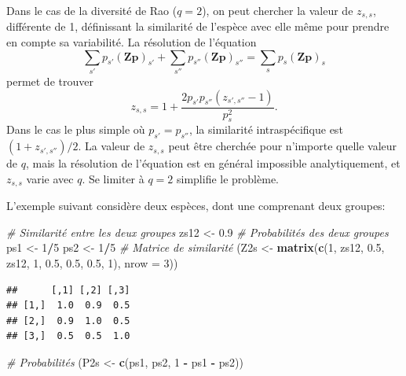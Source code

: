 \documentclass[
  11pt,
  french,
  a4paper,
  extrafontsizes,onecolumn,openright
  ]{memoir}
\newenvironment{Shaded}{\begin{snugshade}}{\end{snugshade}}
\newcommand{\AttributeTok}[1]{\textcolor[rgb]{0.13,0.29,0.53}{#1}}
\newcommand{\CommentTok}[1]{\textcolor[rgb]{0.56,0.35,0.01}{\textit{#1}}}
\newcommand{\DecValTok}[1]{\textcolor[rgb]{0.00,0.00,0.81}{#1}}
\newcommand{\FloatTok}[1]{\textcolor[rgb]{0.00,0.00,0.81}{#1}}
\newcommand{\FunctionTok}[1]{\textcolor[rgb]{0.13,0.29,0.53}{\textbf{#1}}}
\newcommand{\NormalTok}[1]{#1}
\newcommand{\OtherTok}[1]{\textcolor[rgb]{0.56,0.35,0.01}{#1}}
\newcommand{\SpecialCharTok}[1]{\textcolor[rgb]{0.81,0.36,0.00}{\textbf{#1}}}
\begin{document}
Dans le cas de la diversité de Rao (\(q=2\)), on peut chercher la valeur de \(z_{s,s}\), différente de 1, définissant la similarité de l'espèce avec elle même pour prendre en compte sa variabilité.
La résolution de l'équation
\[\sum_{s'}{p_{s'}{\left(\mathbf{Zp}\right)}_{s'}}+\sum_{s''}{p_{s''}{\left(\mathbf{Zp}\right)}_{s''}} = \sum_{s}{p_{s}{\left(\mathbf{Zp}\right)}_{s}}\]
permet de trouver
\[z_{s,s}=1+ \frac{2 p_{s'} p_{s''}(z_{s',s''}-1)}{p_s^2}.\]
Dans le cas le plus simple où \(p_{s'}=p_{s''}\), la similarité intraspécifique est \({(1+z_{s',s''})}/{2}\).
La valeur de \(z_{s,s}\) peut être cherchée pour n'importe quelle valeur de \(q\), mais la résolution de l'équation est en général impossible analytiquement, et \(z_{s,s}\) varie avec \(q\).
Se limiter à \(q=2\) simplifie le problème.

L'exemple suivant considère deux espèces, dont une comprenant deux groupes:

\scriptsize

\begin{Shaded}
\begin{Highlighting}[]
\CommentTok{\# Similarité entre les deux groupes}
\NormalTok{zs12 }\OtherTok{\textless{}{-}} \FloatTok{0.9}
\CommentTok{\# Probabilités des deux groupes}
\NormalTok{ps1 }\OtherTok{\textless{}{-}} \DecValTok{1}\SpecialCharTok{/}\DecValTok{5}
\NormalTok{ps2 }\OtherTok{\textless{}{-}} \DecValTok{1}\SpecialCharTok{/}\DecValTok{5}
\CommentTok{\# Matrice de similarité}
\NormalTok{(Z2s }\OtherTok{\textless{}{-}} \FunctionTok{matrix}\NormalTok{(}\FunctionTok{c}\NormalTok{(}\DecValTok{1}\NormalTok{, zs12, }\FloatTok{0.5}\NormalTok{, zs12, }\DecValTok{1}\NormalTok{, }\FloatTok{0.5}\NormalTok{, }\FloatTok{0.5}\NormalTok{, }\FloatTok{0.5}\NormalTok{, }\DecValTok{1}\NormalTok{), }\AttributeTok{nrow =} \DecValTok{3}\NormalTok{))}
\end{Highlighting}
\end{Shaded}

\begin{verbatim}
##      [,1] [,2] [,3]
## [1,]  1.0  0.9  0.5
## [2,]  0.9  1.0  0.5
## [3,]  0.5  0.5  1.0
\end{verbatim}

\begin{Shaded}
\begin{Highlighting}[]
\CommentTok{\# Probabilités}
\NormalTok{(P2s }\OtherTok{\textless{}{-}} \FunctionTok{c}\NormalTok{(ps1, ps2, }\DecValTok{1} \SpecialCharTok{{-}}\NormalTok{ ps1 }\SpecialCharTok{{-}}\NormalTok{ ps2))}
\end{Highlighting}
\end{Shaded}
\end{document}
